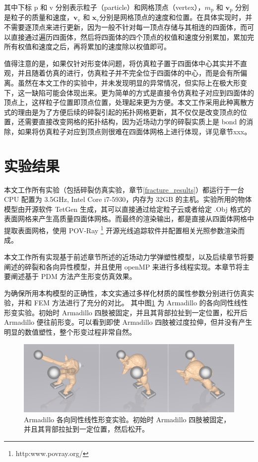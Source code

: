 其中下标 $\mathrm{p}$ 和 $\mathrm{v}$ 分别表示粒子（particle）和网格顶点（vertex），$m_{\mathrm{p}}$ 和 $\textbf{v}_{\mathrm{p}}$ 分别是粒子的质量和速度，$\textbf{v}_{\mathrm{v}}$ 和 $\textbf{x}_{\mathrm{v}}$分别是网格顶点的速度和位置。在具体实现时，并不需要逐顶点来进行更新，因为一般不针对每一顶点存储与其相连的四面体，而可以直接通过遍历四面体，然后将四面体的四个顶点的权值和速度分别累加，累加完所有权值和速度之后，再将累加的速度除以权值即可。

值得注意的是，如果仅针对形变体问题，将仿真粒子置于四面体中心其实并不直观，并且随着仿真的进行，仿真粒子并不完全位于四面体的中心，而是会有所偏离。虽然在本文工作的实验中，并未发现明显的异常情况，但实际上在极大形变下，这一缺陷可能会体现出来。更为简单的方式是直接令仿真粒子对应到四面体的顶点上，这样粒子位置即顶点位置，处理起来更为方便。本文工作采用此种离散方式的理由是为了方便后续的碎裂引起的拓扑网格更新，其不仅仅是改变顶点的位置，还需要直接改变网格的拓扑结构，因为近场动力学的碎裂实质上是 bond 的消除，如果将仿真粒子对应到顶点则很难在四面体网格上进行体现，详见章节xxx。



\section{实验结果}
\label{deformation_results}

本文工作所有实验（包括碎裂仿真实验，章节\ref{fracture_results}）都运行于一台 CPU 配置为 3.5GHz, Intel Core i7-5930，内存为 32GB 的主机。实验所用的物体模型由开源软件 TetGen 生成，其可以直接通过给定粒子云或者给定 .Obj 格式的表面网格来产生高质量四面体网格。而最终的渲染输出，都是直接从四面体网格中提取表面网格，使用 POV-Ray \footnote{http:www.povray.org/} 开源光线追踪软件并配置相关光照参数渲染而成。

本文工作所有实现基于前述章节所述的近场动力学弹塑性模型，以及后续章节将要阐述的碎裂和各向异性模型，并且使用 openMP 来进行多线程实现。本章节将主要阐述基于 PDM 方法产生形变仿真效果。

为确保所用本构模型的正确性，本文实通过多样化材质的属性参数分别进行仿真实验，并和 FEM 方法进行了充分的对比。
其中图\ref{demo_pull_armadillo} 为 Armadillo 的各向同性线性形变实验。初始时 Armadillo 四肢被固定，并且其背部拉扯到一定位置，松开后 Armadillo 便往前形变。可以看到即使 Armadillo 四肢被过度拉伸，但并没有产生明显的数值塑性，整个形变过程非常自然。


\begin{figure}[!htb]
  \centering
  \captionsetup{justification=centering}
  \includegraphics[width=0.9\linewidth]{chap/image/demo_pull_armadillo}

  \caption{\label{demo_pull_armadillo}
           Armadillo 各向同性线性形变实验。初始时 Armadillo 四肢被固定，并且其背部拉扯到一定位置，然后松开。
          }
\end{figure}

